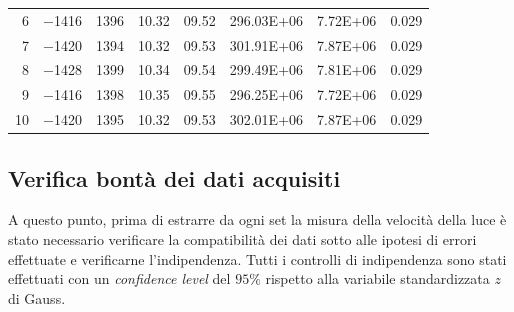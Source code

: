 \documentclass[a4paper,11pt]{article}
\begin{document}
\begin{table}[htbp]
\begin{tabular}{rllllllr}
			\rowcolor[rgb]{ .741,  .843,  .933} 6     & \cellcolor[rgb]{ .929,  .929,  .929} \num{-1416} & \cellcolor[rgb]{ .929,  .929,  .929} \num{1396} & \cellcolor[rgb]{ .929,  .929,  .929} \num{10.32} & \cellcolor[rgb]{ .929,  .929,  .929} \num{09.52} & \cellcolor[rgb]{ .929,  .929,  .929} \num{296.03E+06} & \cellcolor[rgb]{ .929,  .929,  .929} \num{7.72E+06} & \cellcolor[rgb]{ .929,  .929,  .929} 0.029 \\
			\rowcolor[rgb]{ .741,  .843,  .933} 7     & \cellcolor[rgb]{ .859,  .859,  .859} \num{-1420} & \cellcolor[rgb]{ .859,  .859,  .859} \num{1394} & \cellcolor[rgb]{ .859,  .859,  .859} \num{10.32} & \cellcolor[rgb]{ .859,  .859,  .859} \num{09.53} & \cellcolor[rgb]{ .859,  .859,  .859} \num{301.91E+06} & \cellcolor[rgb]{ .859,  .859,  .859} \num{7.87E+06} & \cellcolor[rgb]{ .859,  .859,  .859} 0.029 \\
			\rowcolor[rgb]{ .741,  .843,  .933} 8     & \cellcolor[rgb]{ .929,  .929,  .929} \num{-1428} & \cellcolor[rgb]{ .929,  .929,  .929} \num{1399} & \cellcolor[rgb]{ .929,  .929,  .929} \num{10.34} & \cellcolor[rgb]{ .929,  .929,  .929} \num{09.54} & \cellcolor[rgb]{ .929,  .929,  .929} \num{299.49E+06} & \cellcolor[rgb]{ .929,  .929,  .929} \num{7.81E+06} & \cellcolor[rgb]{ .929,  .929,  .929} 0.029 \\
			\rowcolor[rgb]{ .741,  .843,  .933} 9     & \cellcolor[rgb]{ .859,  .859,  .859} \num{-1416} & \cellcolor[rgb]{ .859,  .859,  .859} \num{1398} & \cellcolor[rgb]{ .859,  .859,  .859} \num{10.35} & \cellcolor[rgb]{ .859,  .859,  .859} \num{09.55} & \cellcolor[rgb]{ .859,  .859,  .859} \num{296.25E+06} & \cellcolor[rgb]{ .859,  .859,  .859} \num{7.72E+06} & \cellcolor[rgb]{ .859,  .859,  .859} 0.029 \\
			\rowcolor[rgb]{ .741,  .843,  .933} 10    & \cellcolor[rgb]{ .929,  .929,  .929} \num{-1420} & \cellcolor[rgb]{ .929,  .929,  .929} \num{1395} & \cellcolor[rgb]{ .929,  .929,  .929} \num{10.32} & \cellcolor[rgb]{ .929,  .929,  .929} \num{09.53} & \cellcolor[rgb]{ .929,  .929,  .929} \num{302.01E+06} & \cellcolor[rgb]{ .929,  .929,  .929} \num{7.87E+06} & \cellcolor[rgb]{ .929,  .929,  .929} 0.029 \\
		\end{tabular}%
		\label{tab:couterclockclockdata}%
	\end{table}%
	\newpage
	\subsection{Verifica bontà dei dati acquisiti}
	A questo punto, prima di estrarre da ogni set la misura della velocità della luce è stato necessario verificare la compatibilità dei dati sotto alle ipotesi di errori effettuate e verificarne l'indipendenza. Tutti i controlli di indipendenza sono stati effettuati con un \emph{confidence level} del $ 95\% $ rispetto alla variabile standardizzata $ z $ di Gauss. 
	
\end{document}
